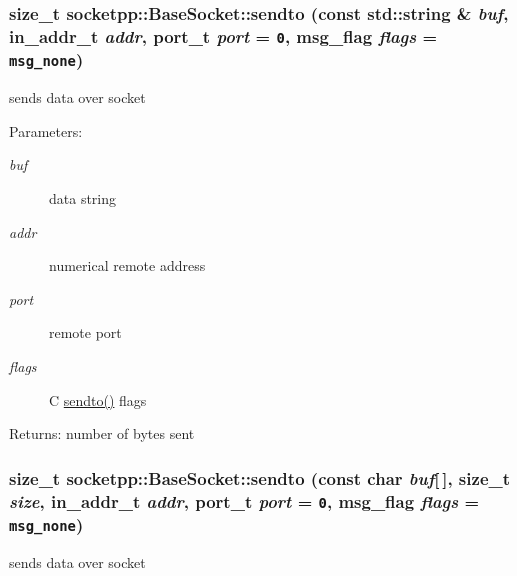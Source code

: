 \begin{CompactItemize}
{\subsubsection[{sendto}]{\setlength{\rightskip}{0pt plus 5cm}size\_\-t socketpp::BaseSocket::sendto (const std::string \& {\em buf}, \/  in\_\-addr\_\-t {\em addr}, \/  port\_\-t {\em port} = {\tt 0}, \/  msg\_\-flag {\em flags} = {\tt msg\_\-none})}}
\label{classsocketpp_1_1BaseSocket_5a2b11a5b30d54cc303f480eeb5642b1}


sends data over socket 

\begin{Desc}
\item[Parameters:]
\begin{description}
\item[{\em buf}]data string \item[{\em addr}]numerical remote address \item[{\em port}]remote port \item[{\em flags}]C \hyperlink{classsocketpp_1_1BaseSocket_d6df36281c6fce81e5c4c493ac91a6f8}{sendto()} flags \end{description}
\end{Desc}
\begin{Desc}
\item[Returns:]number of bytes sent \end{Desc}
\hypertarget{classsocketpp_1_1BaseSocket_d6df36281c6fce81e5c4c493ac91a6f8}{
\subsubsection[{sendto}]{\setlength{\rightskip}{0pt plus 5cm}size\_\-t socketpp::BaseSocket::sendto (const char {\em buf}\mbox{[}$\,$\mbox{]}, \/  size\_\-t {\em size}, \/  in\_\-addr\_\-t {\em addr}, \/  port\_\-t {\em port} = {\tt 0}, \/  msg\_\-flag {\em flags} = {\tt msg\_\-none})}}
\label{classsocketpp_1_1BaseSocket_d6df36281c6fce81e5c4c493ac91a6f8}


sends data over socket 


\end{CompactItemize}
